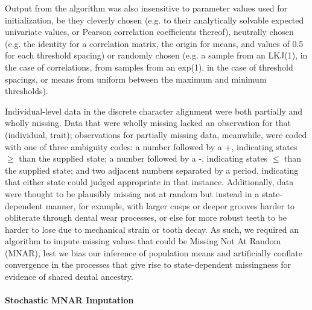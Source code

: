 \documentclass[12pt, twocolumn, twoside]{article}
\begin{document}
Output from the algorithm was also insensitive to parameter values used for initialization, be they cleverly chosen (e.g. to their analytically solvable expected univariate values, or Pearson correlation coefficients thereof), neutrally chosen (e.g. the identity for a correlation matrix, the origin for means, and values of 0.5 for each threshold spacing) or randomly chosen (e.g. a sample from an LKJ(1), in the case of correlations, from samples from an exp(1), in the case of threshold spacings, or means from uniform between the maximum and minimum thresholds). 

Individual-level data in the discrete character alignment were both partially and wholly missing. Data that were wholly missing lacked an observation for that (individual, trait); observations for partially missing data, meanwhile, were coded with one of three ambiguity codes: a number followed by a +, indicating states $\geq$ than the supplied state; a number followed by a -, indicating states $\leq$ than the supplied state; and two adjacent numbers separated by a period, indicating that either state could judged appropriate in that instance. Additionally, data were thought to be plausibly missing not at random but instead in a state-dependent manner, for example, with larger cusps or deeper grooves harder to obliterate through dental wear processes, or else for more robust teeth to be harder to lose due to mechanical strain or tooth decay. As such, we required an algorithm to impute missing values that could be Missing Not At Random (MNAR), lest we bias our inference of population means and artificially conflate convergence in the processes that give rise to state-dependent missingness for evidence of shared dental ancestry.

\paragraph{Stochastic MNAR Imputation}
\end{document}
